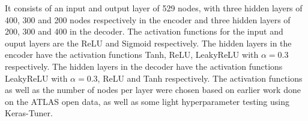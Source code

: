 It consists of an input and output layer of 529 nodes, with three 
hidden layers of 400, 300 and 200 nodes respectively in the encoder and three hidden layers of 200, 300 and 400 in the decoder. 
The activation functions for the input and ouput layers are the ReLU and Sigmoid respectively. The hidden 
layers in the encoder have the activation functions Tanh, ReLU, LeakyReLU with $\alpha=0.3$ respectively. The hidden layers
in the decoder have the activation functions LeakyReLU with $\alpha=0.3$, ReLU and Tanh respectively. The activation functions 
as well as the number of nodes per layer were chosen based on earlier work done 
on the ATLAS open data\cite{fys5555}, as well as some light hyperparameter testing using Keras-Tuner\cite{omalley2019kerastuner}.